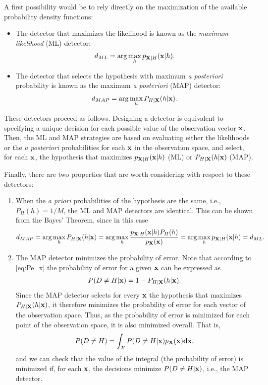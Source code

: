 A first possibility would be to rely directly on the maximization of the available probability density functions:

\begin{itemize}
\item The detector that maximizes the likelihood is known as the {\em maximum likelihood} (ML) detector:
    $$d_{ML} = \arg\max_h p_{{\bf X}|H}({\bf x}|h).$$
\item The detector that selects the hypothesis with maximum {\em a posteriori} probability is known as the  maximum {\em a posteriori} (MAP) detector:
    $$d_{MAP} = \arg\max_h P_{H|{\bf X}}(h|{\bf x}).$$
\end{itemize}

These detectors proceed as follows. Designing a detector is equivalent to specifying a unique decision for each possible value of the observation vector ${\bf x}$. Then, the ML and MAP strategies are based on evaluating either the likelihoods or the {\em a posteriori} probabilities for each ${\bf x}$ in the observation space, and select, for each ${\bf x}$, the hypothesis that maximizes $p_{{\bf X}|H}({\bf x}|h)$ (ML) or $P_{H|{\bf X}}(h|{\bf x})$ (MAP).

Finally, there are two properties that are worth considering with respect to these detectors:
\begin{enumerate}
    \item When the {\em a priori} probabilities of the hypothesis are the same, i.e., $P_H(h) = 1/M$, the ML and MAP detectors are identical. This can be shown from the Bayes' Theorem, since in this case
    $$d_{MAP} = \arg\max_h P_{H|{\bf X}}(h|{\bf x}) = \arg\max_h \frac{p_{{\bf X}|H}({\bf x}|h) P_H(h)}{p_{\bf X}(\bf x)} = \arg\max_h p_{{\bf X}|H}({\bf x}|h) = d_{ML}.$$
    
    \item The MAP detector minimizes the probability of error. Note that according to \eqref{eq:Pe_x} the probability of error for a given $\bf x$ can be expressed as
    $$P(D\neq H|{\bf x}) = 1 - P_{ H|{\bf X}}(h|{\bf x}).$$
    Since the MAP detector selects for every $\bf x$ the hypothesis that maximizes $P_{H|{\bf X}}(h|{\bf x})$, it therefore minimizes the probability of error for each vector of the observation space. Thus, as the probability of error is minimized for each point of the observation space, it is also minimized overall. That is,
    $$P(D\neq H) = \int_{\mathcal{X}} P(D\neq H|{\bf x}) p_{\bf X}(\bf x) d{\bf x},$$
    and we can check that the value of the integral (the probability of error) is minimized if, for each $\bf x$, the decisions minimize $P(D\neq H|{\bf x})$, i.e., the MAP detector.
    
\end{enumerate}

